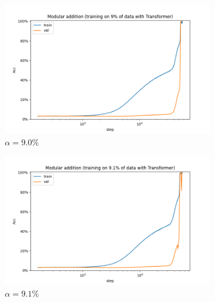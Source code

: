 \begin{figure}[!ht]
	\centering
	\begin{subfigure}{0.3\textwidth}
		\centering
		\includegraphics[width=\linewidth]{fig/Transformer_p=31/K=4/dropout=0.1,wd=0.1/alpha=9.0_dropout=0.1_wd=0.1/addition_9.0_Transformer_step.png}
		\caption{$\alpha=9.0\%$}
		\label{fig:alpha=9.0}
	\end{subfigure}
		\begin{subfigure}{0.3\textwidth}
		\centering
		\includegraphics[width=\linewidth]{fig/Transformer_p=31/K=4/dropout=0.1,wd=0.1/alpha=9.1_dropout=0.1_wd=0.1/addition_9.1_Transformer_step.png}
		\caption{$\alpha=9.1\%$}
		\label{fig:alpha=9.1}
	\end{subfigure}
	\begin{subfigure}{0.3\textwidth}
		\centering

\end{subfigure}
\end{figure}
